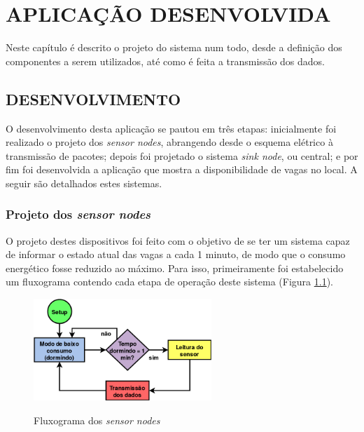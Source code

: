 \documentclass[oneside,openright,12pt]{ufsm_2015} %
\begin{document}
\chapter{APLICAÇÃO DESENVOLVIDA}
Neste capítulo é descrito o projeto do sistema num todo, desde a definição dos componentes a serem utilizados, até como é feita a transmissão dos dados.

    \section{DESENVOLVIMENTO}
    O desenvolvimento desta aplicação se pautou em três etapas: inicialmente foi realizado o projeto dos \textit{sensor nodes}, abrangendo desde o esquema elétrico à transmissão de pacotes; depois foi projetado o sistema \textit{sink node}, ou central; e por fim foi desenvolvida a aplicação que mostra a disponibilidade de vagas no local. A seguir são detalhados estes sistemas.
    
    \subsection{Projeto dos \textit{sensor nodes}}
    O projeto destes dispositivos foi feito com o objetivo de se ter um sistema capaz de informar o estado atual das vagas a cada 1 minuto, de modo que o consumo energético fosse reduzido ao máximo. Para isso, primeiramente foi estabelecido um fluxograma contendo cada etapa de operação deste sistema (Figura \ref{fig:flux-sensor-node}).
    
    \begin{figure}[ht]
     	    \caption{\label{exepretex} Fluxograma dos \textit{sensor nodes}}
            \centering
            \includegraphics[width=0.6\textwidth]{figuras/funcionamento-sensor-node.png}
            \vspace{\baselineskip} %
                \label{fig:flux-sensor-node}
    \end{figure}
    
\end{document}

